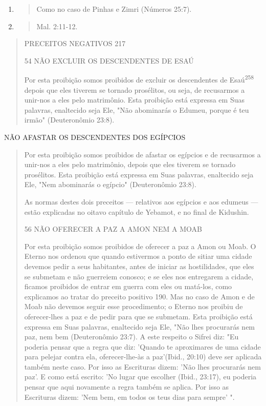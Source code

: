 \begin{enumerate}
\def\labelenumi{\arabic{enumi}.}
\setcounter{enumi}{255}
\item
  \begin{quote}
  Como no caso de Pinhas e Zimri (Números 25:7).
  \end{quote}
\item
  \begin{quote}
  Mal. 2:11-12.
  \end{quote}
\end{enumerate}

\begin{quote}
PRECEITOS NEGATIVOS 217

54 NÃO EXCLUIR OS DESCENDENTES DE ESAÚ

Por esta proibição somos proibidos de excluir os descendentes de
Esaú\textsuperscript{258} depois que eles tiverem se tornado prosélitos,
ou seja, de recusarmos a unir-nos a eles pelo matrimônio. Esta proibição
está expressa em Suas pala­vras, enaltecido seja Ele, "Não abominarás o
Edumeu, porque é teu irmão" (Deu­teronômio 23:8).
\end{quote}

NÃO AFASTAR OS DESCENDENTES DOS EGÍPCIOS

\begin{quote}
Por esta proibição somos proibidos de afastar os egípcios e de
recu­sarmos a unir-nos a eles pelo matrimônio, depois que eles tiverem
se tornado prosélitos. Esta proibição está expressa em Suas palavras,
enaltecido seja Ele, "Nem abominarás o egípcio" (Deuteronômio 23:8).

As normas destes dois preceitos --- relativos aos egípcios e aos
edu­meus --- estão explicadas no oitavo capítulo de Yebamot, e no final
de Kidushin.

56 NÃO OFERECER A PAZ A AMON NEM A MOAB

Por esta proibição somos proibidos de oferecer a paz a Amon ou Moab. O
Eterno nos ordenou que quando estivermos a ponto de sitiar uma ci­dade
devemos pedir a seus habitantes, antes de iniciar as hostilidades, que
eles se submetam e não guerreiem conosco; e se eles nos entregarem a
cidade, fica­mos proibidos de entrar em guerra com eles ou matá-los,
como explicamos ao tratar do preceito positivo 190. Mas no caso de Amon
e de Moab não devemos seguir esse procedimento; o Eterno nos proibiu de
oferecer-lhes a paz e de pe­dir para que se submetam. Esta proibição
está expressa em Suas palavras, enal­tecido seja Ele, "Não lhes
procurarás nem paz, nem bem (Deuteronômio 23:7). A este respeito o
Sifrei diz: "Eu poderia pensar que a regra que diz: 'Quando te
aproximares de uma cidade para pelejar contra ela, oferecer-lhe-às a
paz'(Ibid., 20:10) deve ser aplicada também neste caso. Por isso as
Escrituras dizem: 'Não lhes procurarás nem paz'. E como está escrito:
'No lugar que escolher (Ibid., 23:17), eu poderia pensar que aqui
novamente a regra também se aplica. Por isso as Escrituras dizem: 'Nem
bem, em todos os teus dias para sempre' ".
\end{quote}

